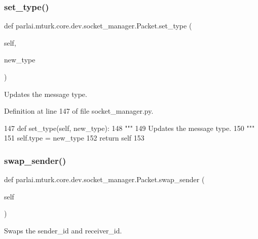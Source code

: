 \subsubsection{\texorpdfstring{set\+\_\+type()}{set\_type()}}
{\footnotesize\ttfamily def parlai.\+mturk.\+core.\+dev.\+socket\+\_\+manager.\+Packet.\+set\+\_\+type (\begin{DoxyParamCaption}\item[{}]{self,  }\item[{}]{new\+\_\+type }\end{DoxyParamCaption})}

\begin{DoxyVerb}Updates the message type.
\end{DoxyVerb}
 

Definition at line 147 of file socket\+\_\+manager.\+py.


\begin{DoxyCode}
147     \textcolor{keyword}{def }set\_type(self, new\_type):
148         \textcolor{stringliteral}{"""}
149 \textcolor{stringliteral}{        Updates the message type.}
150 \textcolor{stringliteral}{        """}
151         self.type = new\_type
152         \textcolor{keywordflow}{return} self
153 
\end{DoxyCode}
\mbox{\label{classparlai_1_1mturk_1_1core_1_1dev_1_1socket__manager_1_1Packet_a52713ae6c40a1c3ef54c309baee5f092}} 
\subsubsection{\texorpdfstring{swap\+\_\+sender()}{swap\_sender()}}
{\footnotesize\ttfamily def parlai.\+mturk.\+core.\+dev.\+socket\+\_\+manager.\+Packet.\+swap\+\_\+sender (\begin{DoxyParamCaption}\item[{}]{self }\end{DoxyParamCaption})}

\begin{DoxyVerb}Swaps the sender_id and receiver_id.
\end{DoxyVerb}
 

